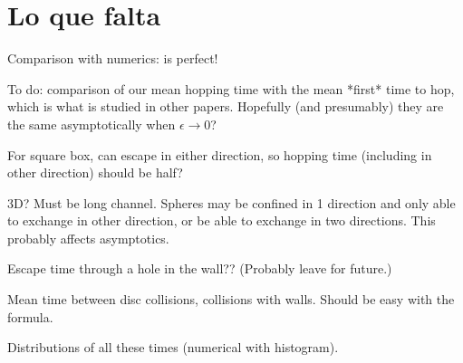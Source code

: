 \documentclass[a4paper,10pt]{article}
\begin{document}
\section{Lo que falta}

Comparison with numerics: is perfect!

To do: comparison of our mean hopping time with the mean *first* time to hop, which is what is studied in other papers.
Hopefully (and presumably) they are the same asymptotically when $\epsilon \to 0$?

For square box, can escape in either direction, so hopping time (including in other direction) should be half?

3D?  Must be long channel. Spheres may be confined in 1 direction  and only able to exchange in other direction, or be able to exchange in two directions.
This probably affects asymptotics.

Escape time through a hole in the wall?? (Probably leave for future.)

Mean time between disc collisions, collisions with walls. Should be easy with the formula.

Distributions of all these times (numerical with histogram).


\end{document}
